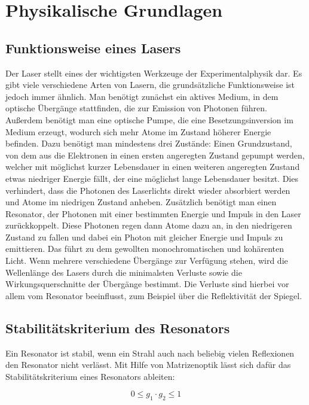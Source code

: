 \section{Physikalische Grundlagen}

\subsection{Funktionsweise eines Lasers}


Der Laser stellt eines der wichtigsten Werkzeuge der Experimentalphysik dar. Es gibt viele
verschiedene Arten von Lasern, die grundsätzliche Funktionsweise ist jedoch immer ähnlich. Man
benötigt zunächst ein aktives Medium, in dem optische Übergänge stattfinden, die zur Emission von
Photonen führen. Außerdem benötigt man eine optische Pumpe, die eine Besetzungsinversion im Medium
erzeugt, wodurch sich mehr Atome im Zustand höherer Energie befinden. Dazu benötigt man mindestens
drei Zustände: Einen Grundzustand, von dem aus die Elektronen in einen ersten angeregten Zustand
gepumpt werden, welcher mit möglichst kurzer Lebensdauer in einen weiteren angeregten Zustand etwas
niedriger Energie fällt, der eine möglichst lange Lebensdauer besitzt. Dies verhindert, dass die
Photonen des Laserlichts direkt wieder absorbiert werden und Atome im niedrigen Zustand
anheben. Zusätzlich benötigt man einen Resonator, der Photonen mit einer bestimmten Energie und
Impuls in den Laser zurückkoppelt. Diese Photonen regen dann Atome dazu an, in den niedrigeren
Zustand zu fallen und dabei ein Photon mit gleicher Energie und Impuls zu emittieren. Das führt zu
dem gewollten monochromatischen und kohärenten Licht.
Wenn mehrere verschiedene Übergänge zur Verfügung stehen, wird die Wellenlänge des Lasers durch die
minimalsten Verluste sowie die Wirkungsquerschnitte der Übergänge bestimmt. Die Verluste sind
hierbei vor allem vom Resonator beeinflusst, zum Beispiel über die Reflektivität der Spiegel.



\subsection{Stabilitätskriterium des Resonators}


Ein Resonator ist stabil, wenn ein Strahl auch nach beliebig vielen Reflexionen den Resonator nicht
verlässt.
Mit Hilfe von Matrizenoptik lässt sich dafür das Stabilitätskriterium eines Resonators
ableiten:

\begin{equation}
0\leq g_1 \cdot g_2 \leq 1
\end{equation}

